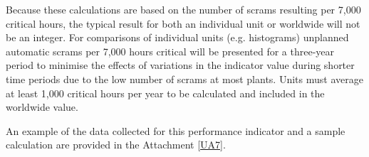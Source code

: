 Because these calculations are based on the number of scrams resulting
per 7,000 critical hours, the typical result for both an individual
unit or worldwide will not be an integer.  For comparisons of
individual units (e.g. histograms) unplanned automatic scrams per
7,000 hours critical will be presented for a three-year period to
minimise the effects of variations in the indicator value during
shorter time periods due to the low number of scrams at most
plants. Units must average at least 1,000 critical hours per year to
be calculated and included in the worldwide value.

An example of the data collected for this performance indicator and a
sample calculation are provided in the Attachment \ref{UA7}.

